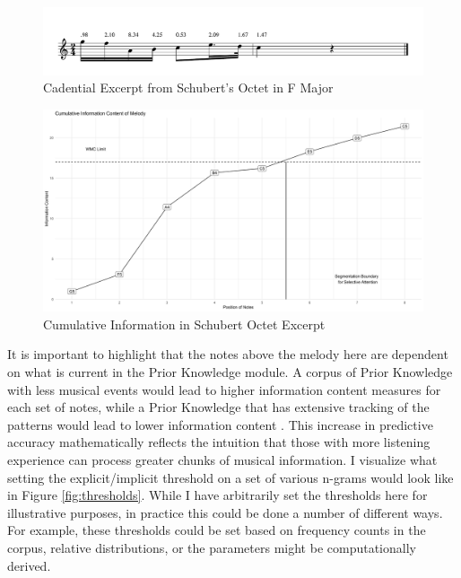 \documentclass[12pt,]{book}
\begin{document}
\begin{figure}

{\centering \includegraphics[width=1\linewidth]{img/SchubertF} 

}

\caption{Cadential Excerpt from Schubert's Octet in F Major}\label{fig:schubertF}
\end{figure}

\begin{figure}

{\centering \includegraphics[width=1\linewidth]{img/SchubertPlotNew} 

}

\caption{Cumulative Information in Schubert Octet Excerpt}\label{fig:cumSchubert}
\end{figure}

It is important to highlight that the notes above the melody here are dependent on what is current in the Prior Knowledge module.
A corpus of Prior Knowledge with less musical events would lead to higher information content measures for each set of notes, while a Prior Knowledge that has extensive tracking of the patterns would lead to lower information content \citep{conklinMultipleViewpointSystems1995}.
This increase in predictive accuracy mathematically reflects the intuition that those with more listening experience can process greater chunks of musical information.
I visualize what setting the explicit/implicit threshold on a set of various n-grams would look like in Figure \ref{fig:thresholds}.
While I have arbitrarily set the thresholds here for illustrative purposes, in practice this could be done a number of different ways.
For example, these thresholds could be set based on frequency counts in the corpus, relative distributions, or the parameters might be computationally derived.
\end{document}
